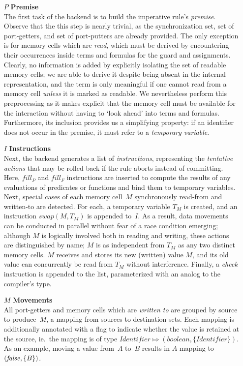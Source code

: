 \begin{enumerate}
	\item [$P$] \textbf{Premise}\\
	
	The first task of the backend is to build the imperative rule's \textit{premise}. Observe that the this step is nearly trivial, as the synchronization set, set of port-getters, and set of port-putters are already provided. The only exception is for memory cells which are \textit{read}, which must be derived by encountering their occurrences inside terms and formulas for the guard and assignments. Clearly, no information is added by explicitly isolating the set of readable memory cells; we are able to derive it despite being absent in the internal representation, and the term is only meaningful if one cannot read from a memory cell \textit{unless} it is marked as readable. We nevertheless perform this preprocessing as it makes explicit that the memory cell must be available for the interaction without having to `look ahead' into terms and formulas. Furthermore, its inclusion provides us a simplifying property: if an identifier does not occur in the premise, it must refer to a \textit{temporary variable}.
	
	\item [$I$] \textbf{Instructions}\\
	Next, the backend generates a list of \textit{instructions}, representing the \textit{tentative actions} that may be rolled back if the rule aborts instead of committing. Here, $fill_P$ and $fill_F$ instructions are inserted to compute the results of any evaluations of predicates or functions and bind them to temporary variables. Next, special cases of each memory cell~$M$ synchronously read-from and written-to are detected. For each, a temporary variable $T_M$ is created, and an instruction $swap(M, T_M)$ is appended to~$I$. As a result, data movements can be conducted in parallel without fear of a race condition emerging; although $M$ is logically involved both in reading and writing, these actions are distinguished by name; $M$ is as independent from $T_M$ as any two distinct memory cells. $M$ receives and stores its new (written) value $M$, and its old value can concurrently be read from $T_M$ without interference. Finally, a \textit{check} instruction is appended to the list, parameterized with an analog to the compiler's  type. 
	
	\item [$M$] \textbf{Movements}\\
	All port-getters and memory cells which are \textit{written to} are grouped by source to produce~$M$, a mapping from sources to destination sets. Each mapping is additionally annotated with a flag to indicate whether the value is retained at the source, ie.\ the mapping is of type $Identifier \Mapsto{} (boolean, \{Identifier\})$. As an example, moving a value from~$A$ to~$B$ results in $A$ mapping to $(\text{\textit{false}}, \{B\})$.
	
\end{enumerate}
